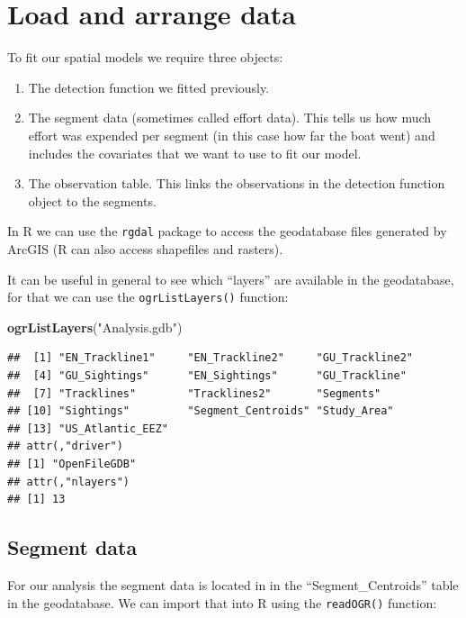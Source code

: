 \documentclass[]{book}
\newenvironment{Shaded}{\begin{snugshade}}{\end{snugshade}}
\newcommand{\KeywordTok}[1]{\textcolor[rgb]{0.13,0.29,0.53}{\textbf{#1}}}
\newcommand{\StringTok}[1]{\textcolor[rgb]{0.31,0.60,0.02}{#1}}
\newcommand{\NormalTok}[1]{#1}
\providecommand{\tightlist}{%
  \setlength{\itemsep}{0pt}\setlength{\parskip}{0pt}}
\theoremstyle{definition}
\theoremstyle{definition}
\theoremstyle{remark}
\begin{document}
\section{Load and arrange data}\label{load-and-arrange-data}

To fit our spatial models we require three objects:

\begin{enumerate}
\def\labelenumi{\arabic{enumi}.}
\tightlist
\item
  The detection function we fitted previously.
\item
  The segment data (sometimes called effort data). This tells us how
  much effort was expended per segment (in this case how far the boat
  went) and includes the covariates that we want to use to fit our
  model.
\item
  The observation table. This links the observations in the detection
  function object to the segments.
\end{enumerate}

In R we can use the \texttt{rgdal} package to access the geodatabase
files generated by ArcGIS (R can also access shapefiles and rasters).

It can be useful in general to see which ``layers'' are available in the
geodatabase, for that we can use the \texttt{ogrListLayers()} function:

\begin{Shaded}
\begin{Highlighting}[]
\KeywordTok{ogrListLayers}\NormalTok{(}\StringTok{"Analysis.gdb"}\NormalTok{)}
\end{Highlighting}
\end{Shaded}

\begin{verbatim}
##  [1] "EN_Trackline1"     "EN_Trackline2"     "GU_Trackline2"    
##  [4] "GU_Sightings"      "EN_Sightings"      "GU_Trackline"     
##  [7] "Tracklines"        "Tracklines2"       "Segments"         
## [10] "Sightings"         "Segment_Centroids" "Study_Area"       
## [13] "US_Atlantic_EEZ"  
## attr(,"driver")
## [1] "OpenFileGDB"
## attr(,"nlayers")
## [1] 13
\end{verbatim}

\subsection{Segment data}\label{segment-data}

For our analysis the segment data is located in in the
``Segment\_Centroids'' table in the geodatabase. We can import that into
R using the \texttt{readOGR()} function:
\end{document}
